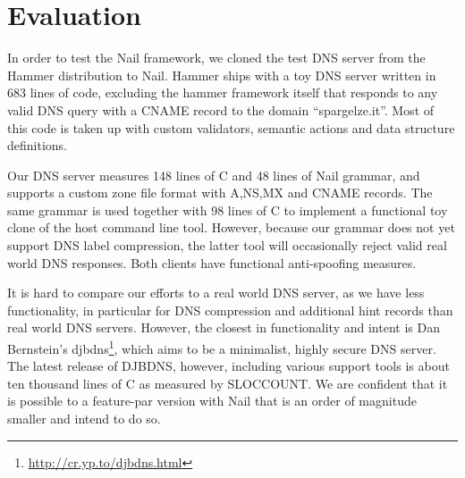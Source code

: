 \section{Evaluation}
In order to test the Nail framework, we cloned the test DNS server from the Hammer distribution to
Nail. Hammer ships with a toy DNS server written in 683 lines of code, excluding the hammer
framework itself that responds to any valid DNS query with a CNAME record to the domain
``spargelze.it''.  Most of this code is taken up with custom validators, semantic actions and data
structure definitions. 

Our DNS server measures 148 lines of C and 48 lines of Nail grammar, and supports a custom zone file format
with A,NS,MX and CNAME records. The same grammar is used together with 98 lines of C to implement a
functional toy clone of the host command line tool. However, because our grammar does not yet
support DNS label compression, the latter tool will occasionally reject valid real world DNS
responses. Both clients have functional anti-spoofing measures.

It is hard to compare our efforts to a real world DNS server, as we have less functionality, in
particular for DNS compression and additional hint records than real world DNS servers. 
However, the closest in functionality and intent is Dan Bernstein's djbdns\footnote{\url{http://cr.yp.to/djbdns.html}}, which aims
to be a minimalist, highly secure DNS server. The latest release of DJBDNS, however, including
various support tools is about ten thousand lines of C as measured by SLOCCOUNT. We are confident
that it is possible to a feature-par version with Nail that is an order of magnitude smaller and
intend to do so.


